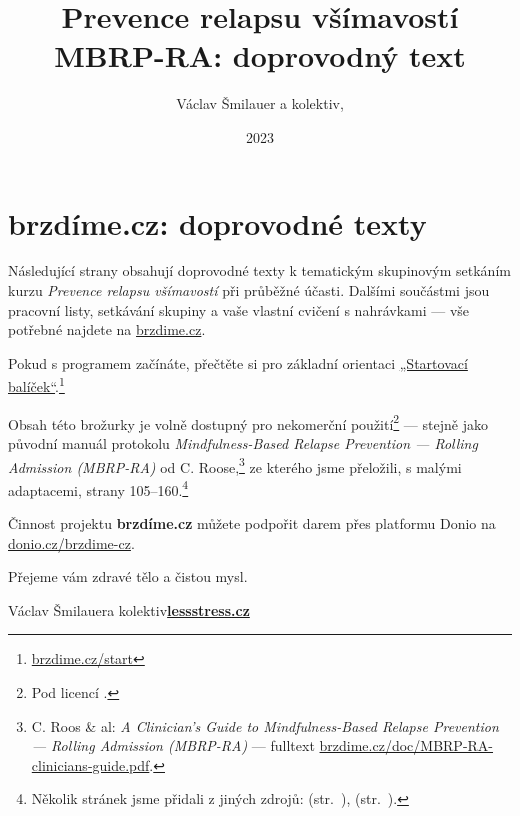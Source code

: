 \documentclass[11pt,a5paper,twoside]{article}
\title{Prevence relapsu všímavostí MBRP-RA: doprovodný text}
\date{2023}
\author{Václav Šmilauer a kolektiv, \lessstressLogo}
\def\lessstressLogo{\href{https://lessstress.cz}{\textsf{\textbf{le\uline{\uline{\uline{s}s}s}tre\uline{\uline{s}s}.cz\uline{\hphantom{s}}}}}}
\begin{document}
	\thispagestyle{empty}
	\section*{brzdíme.cz: doprovodné texty}

	Následující strany obsahují doprovodné texty k tematickým skupinovým setkáním kurzu \emph{Prevence relapsu všímavostí} při průběžné účasti. Dalšími součástmi jsou pracovní listy, setkávání skupiny a vaše vlastní cvičení s nahrávkami — vše potřebné najdete na \href{https://brzdime.cz}{brzdime.cz}.

	Pokud s programem začínáte, přečtěte si pro základní orientaci \href{https://brzdime.cz/start}{„Startovací balíček“}.\footnote{\href{https://brzdime.cz/start}{brzdime.cz/start}}

	Obsah této brožurky je volně dostupný pro nekomerční použití\footnote{Pod licencí \doclicenseNameRef.} — stejně jako původní manuál protokolu \emph{Mindfulness-Based Relapse Prevention — Rolling Admission (MBRP-RA)} od C. Roose,\footnote{C. Roos \& al: \emph{A Clinician's Guide to Mindfulness-Based Relapse Prevention — Rolling Admission (MBRP-RA)} — fulltext \href{https://brzdime.cz/doc/MBRP-RA-clinicians-guide.pdf}{brzdime.cz/doc/MBRP-RA-clinicians-guide.pdf}.} ze kterého jsme přeložili, s malými adaptacemi, strany 105–160.\footnote{Několik stránek jsme přidali z jiných zdrojů:
		 (str.~\pageref{slovni-zasoba-pocity}),
		 (str.~\pageref{slovni-zasoba-potreby}).
	}

	Činnost projektu \textbf{brzdíme.cz} můžete podpořit darem přes platformu Donio na \href{https://donio.cz/brzdime-cz}{donio.cz/brzdime-cz}.

	Přejeme vám zdravé tělo a čistou mysl.

	\hfill Václav Šmilauer\linebreak\null\hfill a kolektiv\linebreak\null\hfill\lessstressLogo

	\setlength{\cftbeforesecskip}{1ex}
	\clearpage
	\tableofcontents
	\thispagestyle{empty}

	
\end{document}
